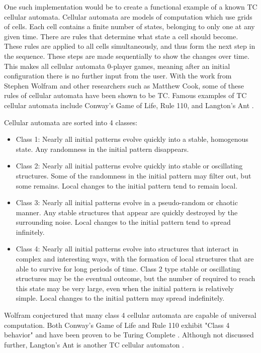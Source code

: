One such implementation would be to create a functional example of a known TC cellular automata.
Cellular automata are models of computation which use grids of cells.
Each cell contains a finite number of states, belonging to only one at any given time.
There are rules that determine what state a cell should become.
These rules are applied to all cells simultaneously, and thus form the next step in the sequence.
These steps are made sequentially to show the changes over time.
This makes all cellular automata 0-player games, meaning after an initial configuration there is no further input from the user.
With the work from Stephen Wolfram and other researchers such as Matthew Cook, some of these rules of cellular automata have been shown to be TC.
Famous examples of TC cellular automata include Conway's Game of Life, Rule 110, and Langton's Ant \cite{CellAutWiki,CellAutWolfram,CGoLTM,AntyParticles,AntWiki}.

Cellular automata are sorted into 4 classes:
\begin{itemize}[leftmargin=2cm]
    \item Class 1: Nearly all initial patterns evolve quickly into a stable, homogenous state.
    Any randomness in the initial pattern disappears.
    \item Class 2: Nearly all initial patterns evolve quickly into stable or oscillating structures.
    Some of the randomness in the initial pattern may filter out, but some remains.
    Local changes to the initial pattern tend to remain local.
    \item Class 3: Nearly all initial patterns evolve in a pseudo-random or chaotic manner.
    Any stable structures that appear are quickly destroyed by the surrounding noise.
    Local changes to the initial pattern tend to spread infinitely.
    \item Class 4: Nearly all initial patterns evolve into structures that interact in complex and interesting ways, with the formation of local structures that are able to survive for long periods of time.
    Class 2 type stable or oscillating structures may be the eventual outcome, but the number of required to reach this state may be very large, even when the initial pattern is relatively simple.
    Local changes to the initial pattern may spread indefinitely.
\end{itemize}

Wolfram conjectured that many class 4 cellular automata are capable of universal computation.
Both Conway's Game of Life and Rule 110 exhibit "Class 4 behavior" and have been proven to be Turing Complete \cite{CGoLTM,CellAutBook}.
Although not discussed further, Langton's Ant is another TC cellular automaton \cite{AntWiki,AntyParticles}.

